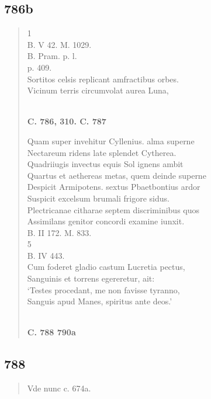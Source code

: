 \documentclass[11pt, a4paper]{report}
\begin{document}
            \subsection*{786b}
      \begin{verse}
      1 \\ B. V 42. M. 1029. \\ B. Pram. p. l. \\ p. 409. \\ Sortitos celsis replicant amfractibus orbes. \\ Vicinum terris circumvolat aurea Luna, \\ 
        ﻿\pagebreak 
    \begin{center} \textbf{C. 786, 310. C. 787} \end{center} \marginpar{[267]} Quam super invehitur Cyllenius. alma superne \\ Nectareum ridens late splendet Cytherea. \\ Quadriiugis invectus equis Sol ignens ambit \\ Quartus et aethereas metas, quem deinde superne \\ Despicit Armipotens. sextus Pbaetbontius ardor \\ Suspicit excelsum brumali frigore sidus. \\ Plectricanae citharae septem discriminibus quos \\ Assimilans genitor concordi examine iunxit. \\ B. II 172. M. 833. \\ 5 \\ B. IV 443. \\ Cum foderet gladio castum Lucretia pectus, \\ Sanguinis et torrens egereretur, ait: \\ ‘Testes procedant, me non favisse tyranno, \\ Sanguis apud Manes, spiritus ante deos.’ \\ 
        ﻿\pagebreak 
    \begin{center} \textbf{C. 788 790a} \end{center} \marginpar{[268]} 
      \end{verse}
  
            \subsection*{788}
      \begin{verse}
      Vde nunc c. 674a. \\ 
      \end{verse}
  
\end{document}
